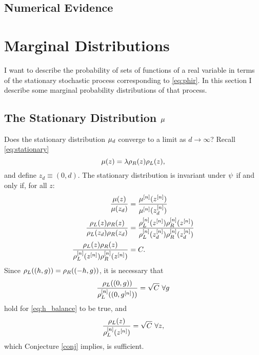 \documentclass[twocolumn]{article}
\begin{document}
\subsection{Numerical Evidence}
\label{sec:evidence}


\section{Marginal Distributions}
\label{sec:marginal}

I want to describe the probability of sets of functions of a real
variable in terms of the stationary stochastic process corresponding
to \eqref{eq:phir}.  In this section I describe some marginal
probability distributions of that process.

\subsection{The Stationary Distribution $\mu$}
\label{sec:convergence}

Does the stationary distribution $\mu_d$ converge to a limit
as $d \rightarrow \infty$?
Recall \eqref{eq:stationary}
\begin{equation*}
  \mu(z) = \lambda \rho_R(z) \rho_L(z),
\end{equation*}
and define $z_d \equiv (0,d)$.  The stationary distribution is
invariant under $\psi_{}$ if and only if, for all $z$:
\begin{align}
  \frac{\stationary(z)}{\stationary(z_d)} &=
  \frac{\stationary\supn(z\supn)}{\stationary\supn(z\supn_d)} \nonumber\\
%
  \frac{\lefunc(z)\refunc(z)}{\lefunc(z_d)\refunc(z_d)} &=
  \frac{\lefunc\supn(z\supn)\refunc\supn(z\supn)}
       {\lefunc\supn(z_d\supn)\refunc\supn(z_d\supn)}
  \nonumber \\ 
  \label{eq:h_balance}
  \frac{\lefunc(z)\refunc(z)}
       {\lefunc\supn(z\supn)\refunc\supn(z\supn)} &= C.
\end{align}
Since $\rho_L((h,g)) = \rho_R((-h,g))$, it is necessary that
\begin{equation}
  \label{eq:h_zero}
  \frac{\rho_L((0,g))}{\rho_L^{[n]}((0,g^{[n]}))} = \sqrt{C} ~\forall g
\end{equation}
hold for \eqref{eq:h_balance} to be true, and
\begin{equation}
  \label{eq:h_any}
  \frac{\rho_L(z)}{\rho_L^{[n]}(z^{[n]})} = \sqrt{C} ~\forall z,
\end{equation}
which Conjecture \ref{conj} implies, is sufficient.
\end{document}
